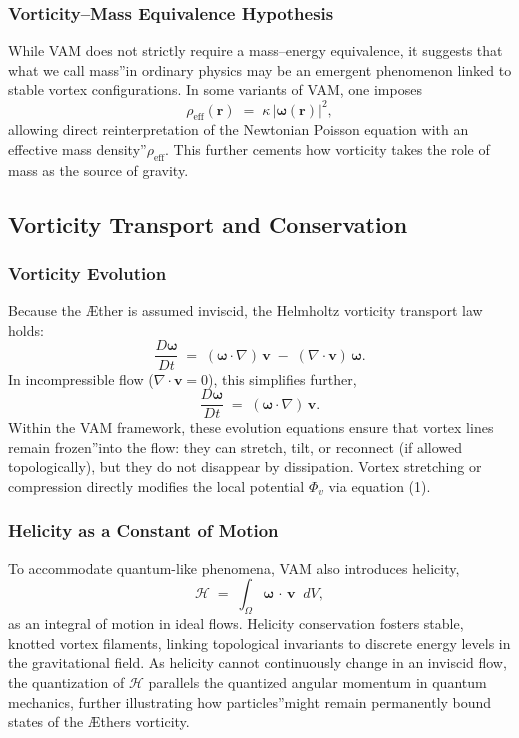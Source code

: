 \subsubsection{Vorticity–Mass Equivalence Hypothesis}

While VAM does not strictly require a mass–energy equivalence, it suggests that what we call \grqq mass\textquotedblright in ordinary physics may be an emergent phenomenon linked to stable vortex configurations. In some variants of VAM, one imposes
\[
    \rho_{\mathrm{eff}}(\mathbf{r}) \;=\; \kappa \,\lvert \boldsymbol{\omega}(\mathbf{r}) \rvert^2,
\]
allowing direct reinterpretation of the Newtonian Poisson equation with an \grqq effective mass density\textquotedblright \(\rho_{\mathrm{eff}}\). This further cements how vorticity takes the role of mass as the source of gravity.

\subsection{Vorticity Transport and Conservation}

\subsubsection{Vorticity Evolution}

Because the Æther is assumed inviscid, the Helmholtz vorticity transport law holds:
\[
    \frac{D \boldsymbol{\omega}}{Dt}
    \;=\;
    (\boldsymbol{\omega} \cdot \nabla)\,\mathbf{v}
    \;-\;
    (\nabla \cdot \mathbf{v})\,\boldsymbol{\omega}.
\]
In incompressible flow (\(\nabla \cdot \mathbf{v} = 0\)), this simplifies further,
\[
    \frac{D \boldsymbol{\omega}}{Dt}
    \;=\;
    (\boldsymbol{\omega} \cdot \nabla)\,\mathbf{v}.
\]
Within the VAM framework, these evolution equations ensure that vortex lines remain \grqq frozen\textquotedblright into the flow: they can stretch, tilt, or reconnect (if allowed topologically), but they do not disappear by dissipation. Vortex stretching or compression directly modifies the local potential \(\Phi_v\) via equation (1).

\subsubsection{Helicity as a Constant of Motion}

To accommodate quantum-like phenomena, VAM also introduces helicity,
\[
    \mathcal{H} \;=\; \int_{\Omega} \boldsymbol{\omega} \,\cdot\, \mathbf{v} \;\;dV,
\]
as an integral of motion in ideal flows. Helicity conservation fosters stable, knotted vortex filaments, linking topological invariants to discrete energy levels in the gravitational field. As helicity cannot continuously change in an inviscid flow, the quantization of \(\mathcal{H}\) parallels the quantized angular momentum in quantum mechanics, further illustrating how \grqq particles\textquotedblright might remain permanently bound states of the Æther\rqs s vorticity.

